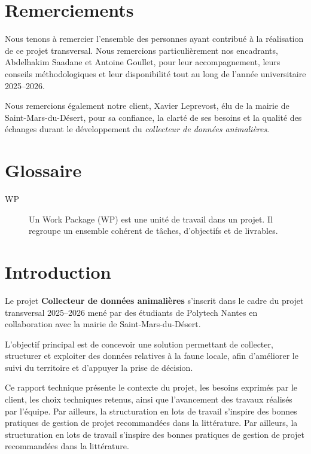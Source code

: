 ﻿\documentclass[11pt]{article}
\begin{document}
\clearpage
\section*{Remerciements}
Nous tenons à remercier l'ensemble des personnes ayant contribué à la réalisation de ce projet transversal. 
Nous remercions particulièrement nos encadrants, Abdelhakim Saadane et Antoine Goullet, pour leur accompagnement,
leurs conseils méthodologiques et leur disponibilité tout au long de l'année universitaire 2025--2026.

Nous remercions également notre client, Xavier Leprevost, élu de la mairie de Saint-Mars-du-Désert,
pour sa confiance, la clarté de ses besoins et la qualité des échanges durant le développement du
\textit{collecteur de données animalières}.

\clearpage
\tableofcontents

\clearpage
\listoffigures
{}

\clearpage
\section*{Glossaire}
\begin{description}
  \item[WP] Un Work Package (WP) est une unité de travail dans un projet. Il regroupe un ensemble cohérent de tâches, d’objectifs et de livrables.

\end{description}


\newpage

\section{Introduction}
Le projet \textbf{Collecteur de données animalières} s'inscrit dans le cadre du projet transversal 2025--2026 mené
par des étudiants de Polytech Nantes en collaboration avec la mairie de Saint-Mars-du-Désert.

L'objectif principal est de concevoir une solution permettant de collecter, structurer et exploiter des données
relatives à la faune locale, afin d'améliorer le suivi du territoire et d'appuyer la prise de décision.

Ce rapport technique présente le contexte du projet, les besoins exprimés par le client, les choix techniques
retenus, ainsi que l'avancement des travaux réalisés par l'équipe. Par ailleurs, la structuration en lots de travail
s'inspire des bonnes pratiques de gestion de projet recommandées dans la littérature\cite{PMBOK2021}. Par ailleurs, la structuration en lots de travail
s'inspire des bonnes pratiques de gestion de projet recommandées dans la littérature\cite{PMBOK2021}.
\end{document}
